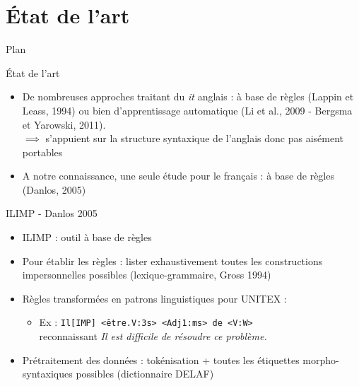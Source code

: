 \documentclass{beamer}
\begin{document}
\section{État de l'art}

\begin{frame}{Plan}
  \tableofcontents[currentsection]
\end{frame}

\begin{frame}{État de l'art}
\begin{itemize}
  \item De nombreuses approches traitant du \og \textit{it} \fg{} anglais : à base de règles (Lappin et Leass, 1994) ou bien d'apprentissage automatique (Li et al., 2009 - Bergsma et Yarowski, 2011).\\
  $\implies$ s'appuient sur la structure syntaxique de l'anglais donc pas aisément portables
  \item A notre connaissance, une seule étude pour le français : à base de règles (Danlos, 2005)\\
\end{itemize}
\end{frame}

\begin{frame}{ILIMP - Danlos 2005}
\begin{itemize}
  \item ILIMP : outil à base de règles
  \item Pour établir les règles : lister exhaustivement toutes les constructions impersonnelles possibles (lexique-grammaire, Gross 1994)
  \item Règles transformées en patrons linguistiques pour UNITEX :\\
  \begin{itemize}
    \item Ex : \verb!Il[IMP] <être.V:3s> <Adj1:ms> de <V:W>!\\
  reconnaissant \og{}\textit{Il est difficile de résoudre ce problème.}\fg{}
  \end{itemize}
  \item Prétraitement des données : tokénisation + toutes les étiquettes morpho-syntaxiques possibles (dictionnaire DELAF)
\end{itemize}
\end{frame}
\end{document}
